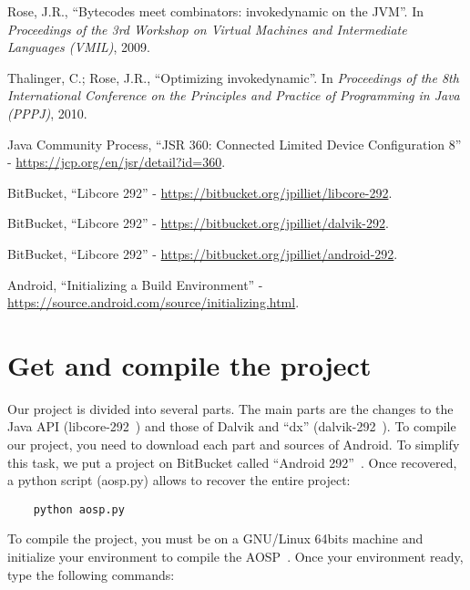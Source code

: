 \documentclass{sig-alternate}
\def \ANDROID{Android\xspace}
\begin{document}
\begin{thebibliography}{}
  Rose, J.R., ``Bytecodes meet combinators: invokedynamic on the JVM''. In {\it Proceedings of the 3rd Workshop on Virtual Machines and Intermediate Languages (VMIL)}, 2009.

  Thalinger, C.; Rose, J.R., ``Optimizing invokedynamic''. In {\it Proceedings of the 8th International Conference on the Principles and Practice of Programming in Java (PPPJ)}, 2010.

  Java Community Process, ``JSR 360: Connected Limited Device Configuration 8'' - \url{https://jcp.org/en/jsr/detail?id=360}.

  BitBucket, ``Libcore 292'' - \url{https://bitbucket.org/jpilliet/libcore-292}.

  BitBucket, ``Libcore 292'' - \url{https://bitbucket.org/jpilliet/dalvik-292}.

  BitBucket, ``Libcore 292'' - \url{https://bitbucket.org/jpilliet/android-292}.

  \ANDROID, ``Initializing a Build Environment'' - \url{https://source.android.com/source/initializing.html}.

\end{thebibliography}

\section{Get and compile the project}

  Our project is divided into several parts.
  The main parts are the changes to the Java API (libcore-292~\cite{bb-libcore}) and those of Dalvik and ``dx'' (dalvik-292~\cite{bb-dalvik}).
  To compile our project, you need to download each part and sources of \ANDROID.
  To simplify this task, we put a project on BitBucket called ``\ANDROID 292''~\cite{bb-android}.
  Once recovered, a python script (aosp.py) allows to recover the entire project:

  {\scriptsize \begin{verbatim}
    python aosp.py
  \end{verbatim}}\vspace{-.8em}

  To compile the project, you must be on a GNU/Linux 64bits machine and initialize your environment to compile the AOSP~\cite{android-sources}.
  Once your environment ready, type the following commands:
 
\end{document}
